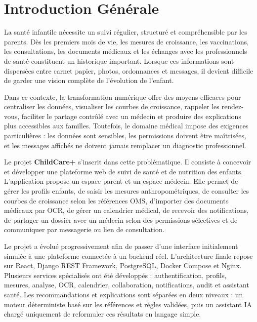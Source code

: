 \chapter*{Introduction Générale}

La santé infantile nécessite un suivi régulier, structuré et compréhensible par les parents. Dès les premiers mois de vie, les mesures de croissance, les vaccinations, les consultations, les documents médicaux et les échanges avec les professionnels de santé constituent un historique important. Lorsque ces informations sont dispersées entre carnet papier, photos, ordonnances et messages, il devient difficile de garder une vision complète de l'évolution de l'enfant.

Dans ce contexte, la transformation numérique offre des moyens efficaces pour centraliser les données, visualiser les courbes de croissance, rappeler les rendez-vous, faciliter le partage contrôlé avec un médecin et produire des explications plus accessibles aux familles. Toutefois, le domaine médical impose des exigences particulières : les données sont sensibles, les permissions doivent être maîtrisées, et les messages affichés ne doivent jamais remplacer un diagnostic professionnel.

Le projet \textbf{ChildCare+} s'inscrit dans cette problématique. Il consiste à concevoir et développer une plateforme web de suivi de santé et de nutrition des enfants. L'application propose un espace parent et un espace médecin. Elle permet de gérer les profils enfants, de saisir les mesures anthropométriques, de consulter les courbes de croissance selon les références OMS, d'importer des documents médicaux par OCR, de gérer un calendrier médical, de recevoir des notifications, de partager un dossier avec un médecin selon des permissions sélectives et de communiquer par messagerie ou lien de consultation.

Le projet a évolué progressivement afin de passer d'une interface initialement simulée à une plateforme connectée à un backend réel. L'architecture finale repose sur React, Django REST Framework, PostgreSQL, Docker Compose et Nginx. Plusieurs services spécialisés ont été développés : authentification, profils, mesures, analyse, OCR, calendrier, collaboration, notifications, audit et assistant santé. Les recommandations et explications sont séparées en deux niveaux : un moteur déterministe basé sur les références et règles validées, puis un assistant IA chargé uniquement de reformuler ces résultats en langage simple.


